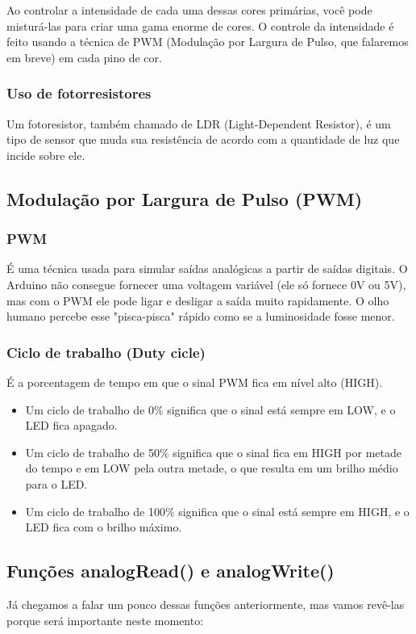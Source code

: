 \documentclass{report}
\begin{document}
	
	
	Ao controlar a intensidade de cada uma dessas cores primárias, você pode misturá-las para criar uma gama enorme de cores. O controle da intensidade é feito usando a técnica de PWM (Modulação por Largura de Pulso, que falaremos em breve) em cada pino de cor.
	
	\subsubsection{Uso de fotorresistores}
	Um fotoresistor, também chamado de LDR (Light-Dependent Resistor), é um tipo de sensor que muda sua resistência de acordo com a quantidade de luz que incide sobre ele. 
	
	\subsection{ Modulação por Largura de Pulso (PWM)}
	\subsubsection{PWM}
	 É uma técnica usada para simular saídas analógicas a partir de saídas digitais. O Arduino não consegue fornecer uma voltagem variável (ele só fornece 0V ou 5V), mas com o PWM ele pode ligar e desligar a saída muito rapidamente. O olho humano percebe esse "pisca-pisca" rápido como se a luminosidade fosse menor.
	 \subsubsection{Ciclo de trabalho (Duty cicle)}
	 É a porcentagem de tempo em que o sinal PWM fica em nível alto (HIGH).
	 \begin{itemize}
	 	\item Um ciclo de trabalho de 0\% significa que o sinal está sempre em LOW, e o LED fica apagado.
	 	\item Um ciclo de trabalho de 50\% significa que o sinal fica em HIGH por metade do tempo e em LOW pela outra metade, o que resulta em um brilho médio para o LED.
	 	\item Um ciclo de trabalho de 100\% significa que o sinal está sempre em HIGH, e o LED fica com o brilho máximo.
	 \end{itemize}
	\subsection{Funções analogRead() e analogWrite()}
	Já chegamos a falar um pouco dessas funções anteriormente, mas vamos revê-las porque será importante neste momento:
	
\end{document}
